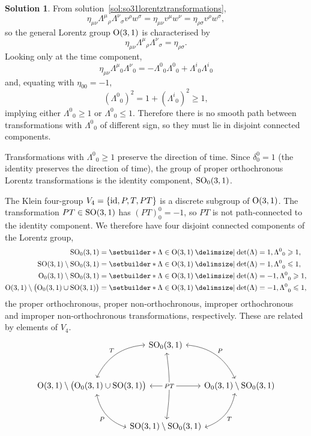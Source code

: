 \documentclass[11pt, a4paper]{report}
\theoremstyle{definition}
\newtheorem{solution}{Solution}[part]
\newenvironment{sol}{\begin{solution}}{\end{solution}\pagebreak[3]}
\renewcommand{\leq}{\leqslant}
\renewcommand{\geq}{\geqslant}
\renewcommand*{\O}{\ensuremath\text{O}}
\newcommand*{\SO}{\ensuremath\text{SO}}
\newcommand*{\op}[1]{\ensuremath\mathop{}\mathopen{}#1}
\newcommand*{\id}{\op{\mathrm{id}}}
\begin{document}
\begin{sol}

From solution~\ref{sol:so31lorentztransformations},
\[
    \eta_{\mu\nu} {\Lambda^\mu}_\rho {\Lambda^\nu}_\sigma v^\rho w^\sigma
        = \eta_{\mu\nu} v^\mu w^\nu
        = \eta_{\rho \sigma} v^\rho w^\sigma,
\]
so the general Lorentz group $\O(3, 1)$ is characterised by
\[
    \eta_{\mu\nu} {\Lambda^\mu}_\rho {\Lambda^\nu}_\sigma = \eta_{\rho\sigma}.
\]
Looking only at the time component,
\[
    \eta_{\mu\nu} {\Lambda^\mu}_0 {\Lambda^\nu}_0
        = -{\Lambda^0}_0 {\Lambda^0}_0 + {\Lambda^i}_0 {\Lambda^i}_0
\]
and, equating with $\eta_{00} = -1$,
\[
    {({\Lambda^0}_0)}^2 = 1 + {({\Lambda^i}_0)}^2 \geq 1,
\]
implying either ${\Lambda^0}_0 \geq 1$ or ${\Lambda^0}_0 \leq 1$.
Therefore there is no smooth path between transformations with ${\Lambda^0}_0$ of different sign, so they must lie in disjoint connected components.

Transformations with ${\Lambda^0}_0 \geq 1$ preserve the direction of time.
Since $\delta_0^0 = 1$ (the identity preserves the direction of time), the group of proper orthochronous Lorentz transformations is the identity component, $\SO_0(3, 1)$.

The Klein four-group $V_4 = \{\id, P, T, PT\}$ is a discrete subgroup of $\O(3, 1)$. The transformation $PT \in \SO(3, 1)$ has ${(PT)}^0_0 = -1$, so $PT$ is not path-connected to the identity component.
We therefore have four disjoint connected components of the Lorentz group,
\begin{align*}
    \SO_0(3, 1) &= \setbuilder*{\Lambda \in \O(3, 1) \given \det(\Lambda) = 1, {\Lambda^0}_0 \geq 1}, \\
    \SO(3, 1) \setminus \SO_0(3, 1)
        &= \setbuilder*{\Lambda \in \O(3, 1)  \given {\det(\Lambda) = 1, \Lambda^0}_0 \leq 1}, \\
    \O_0(3, 1) \setminus \SO_0(3, 1)
        &= \setbuilder*{\Lambda \in \O(3, 1)  \given {\det(\Lambda) = -1, \Lambda^0}_0 \geq 1}, \\
    \O(3, 1) \setminus \bigl( \O_0(3, 1) \cup \SO(3, 1) \bigr)
        &= \setbuilder*{\Lambda \in \O(3, 1)  \given {\det(\Lambda) = -1, \Lambda^0}_0 \leq 1},
\end{align*}
the proper orthochronous, proper non-orthochronous, improper orthochronous and improper non-orthochronous transformations, respectively.
These are related by elements of $V_4$.
\[
    \begin{tikzcd}[row sep=7ex, column sep={8.8em, between origins},
                   every arrow/.append style=leftrightarrow]
        & \SO_0(3, 1) \dlar[bend right=30, swap]{T}
                      \drar[bend left=30]{P} & \\
        \O(3, 1) \setminus \bigl( \O_0(3, 1) \cup \SO(3, 1) \bigr)
                \drar[bend right=30, swap]{P}
                \ar{rr}
            & & \O_0(3, 1) \setminus \SO_0(3, 1)
                \dlar[bend left=30]{T} \\
        & \SO(3, 1) \setminus \SO_0(3, 1) \ar[crossing over, bend right=8, labels=description]{uu}{PT} &
    \end{tikzcd}
\]

\end{sol}
\end{document}
